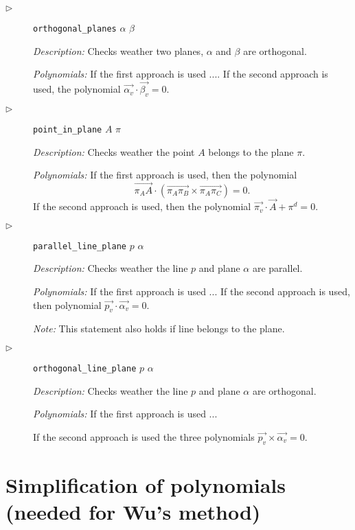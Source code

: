 \documentclass[final,1p,times,authoryear]{elsarticle}
\begin{document}
\begin{description}
\item[$\triangleright$] {\tt orthogonal\_planes} $\alpha$ $\beta$

{\em Description:} Checks weather two planes, $\alpha$ and $\beta$ are
orthogonal.

{\em Polynomials:} 
If the first approach is used ....
If the second approach is used, the polynomial
$\overrightarrow{\alpha_v} \cdot \overrightarrow{\beta_v} = 0$.

\item[$\triangleright$] {\tt point\_in\_plane} $A$ $\pi$

{\em Description:} Checks weather the point $A$ belongs to the plane
$\pi$.

{\em Polynomials:} If the first approach is used, then the polynomial
$$\overrightarrow{\pi_AA}\cdot (\overrightarrow{\pi_A\pi_B} \times \overrightarrow{\pi_A\pi_C}) = 0.$$
If the second approach is used, then the polynomial
$\overrightarrow{\pi_v} \cdot \overrightarrow{A} + \pi^{d} = 0$.

\item[$\triangleright$] {\tt parallel\_line\_plane} $p$ $\alpha$

{\em Description:} Checks weather the line $p$ and plane $\alpha$ are
parallel.

{\em Polynomials:} 
If the first approach is used ...
If the second approach is used, then polynomial
$\overrightarrow{p_v} \cdot \overrightarrow{\alpha_v} = 0$.

{\em Note:} This statement also holds if line belongs to the plane.

\item[$\triangleright$] {\tt orthogonal\_line\_plane} $p$ $\alpha$

{\em Description:} Checks weather the line $p$ and plane $\alpha$ are
orthogonal.

{\em Polynomials:} If the first approach is used ...

If the second approach is used the three polynomials
$\overrightarrow{p_v} \times \overrightarrow{\alpha_v} = 0$.

\end{description}

\section{Simplification of polynomials (needed for Wu's method)}
\label{simplification}
\end{document}
